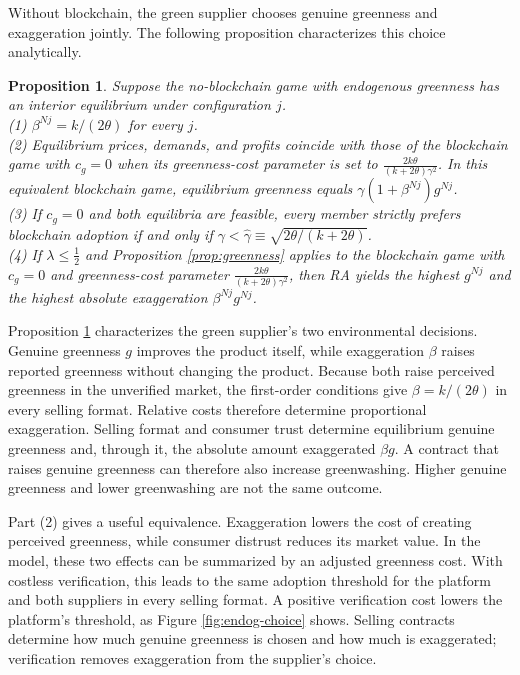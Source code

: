 \documentclass[preprint,review,12pt,authoryear,nopreprintline]{elsarticle}
\newtheorem{proposition}{Proposition}
\theoremstyle{definition}
\begin{document}
Without blockchain, the green supplier chooses genuine greenness and exaggeration jointly. The following proposition characterizes this choice analytically.

\begin{proposition}\label{prop:equivalence}
Suppose the no-blockchain game with endogenous greenness has an interior equilibrium under configuration $j$.\\
(1) $\beta^{Nj}=k/(2\theta)$ for every $j$.\\
(2) Equilibrium prices, demands, and profits coincide with those of the blockchain game with $c_g=0$ when its greenness-cost parameter is set to $\frac{2k\theta}{(k+2\theta)\gamma^2}$. In this equivalent blockchain game, equilibrium greenness equals $\gamma(1+\beta^{Nj})g^{Nj}$.\\
(3) If $c_g=0$ and both equilibria are feasible, every member strictly prefers blockchain adoption if and only if $\gamma<\hat{\gamma}\equiv\sqrt{2\theta/(k+2\theta)}$.\\
(4) If $\lambda\leq\frac12$ and Proposition \ref{prop:greenness} applies to the blockchain game with $c_g=0$ and greenness-cost parameter $\frac{2k\theta}{(k+2\theta)\gamma^2}$, then RA yields the highest $g^{Nj}$ and the highest absolute exaggeration $\beta^{Nj}g^{Nj}$.
\end{proposition}

Proposition \ref{prop:equivalence} characterizes the green supplier's two environmental decisions. Genuine greenness $g$ improves the product itself, while exaggeration $\beta$ raises reported greenness without changing the product. Because both raise perceived greenness in the unverified market, the first-order conditions give $\beta=k/(2\theta)$ in every selling format. Relative costs therefore determine proportional exaggeration. Selling format and consumer trust determine equilibrium genuine greenness and, through it, the absolute amount exaggerated $\beta g$. A contract that raises genuine greenness can therefore also increase greenwashing. Higher genuine greenness and lower greenwashing are not the same outcome.

Part (2) gives a useful equivalence. Exaggeration lowers the cost of creating perceived greenness, while consumer distrust reduces its market value. In the model, these two effects can be summarized by an adjusted greenness cost. With costless verification, this leads to the same adoption threshold for the platform and both suppliers in every selling format. A positive verification cost lowers the platform's threshold, as Figure \ref{fig:endog-choice} shows. Selling contracts determine how much genuine greenness is chosen and how much is exaggerated; verification removes exaggeration from the supplier's choice.
\end{document}
